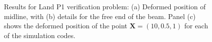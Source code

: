 \begin{figure}[ht!]
{\label{fig:land1-3}}			
%
\caption{Results for Land P1 verification problem: (a) Deformed position of midline, with (b) details for the free end of the beam. Panel (c) shows the deformed position of the point $\bm{X} = (10, 0.5, 1)$ for each of the simulation codes.}
\label{fig:land1}
\end{figure}

\begin{figure}[ht!]
\centering
{}		
\subfigure[]{%
}
\end{figure}
